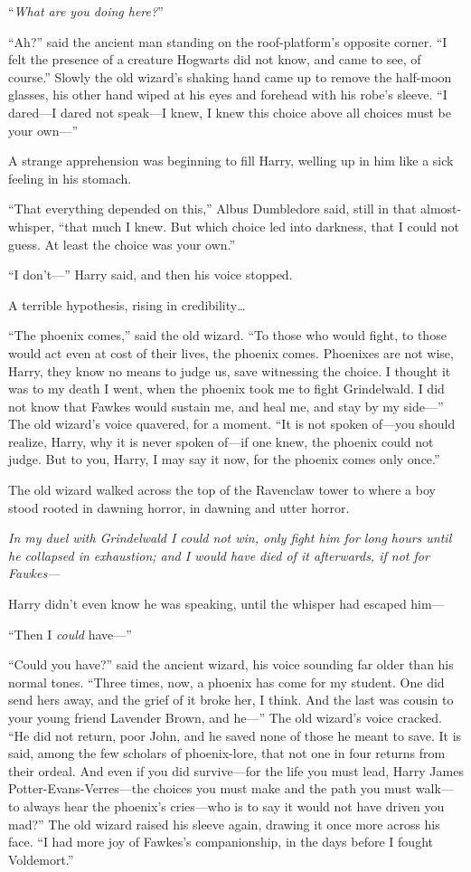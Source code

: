 “\emph{What are you doing here?}”

“Ah?” said the ancient man standing on the roof-platform’s opposite corner. “I felt the presence of a creature Hogwarts did not know, and came to see, of course.” Slowly the old wizard’s shaking hand came up to remove the half-moon glasses, his other hand wiped at his eyes and forehead with his robe’s sleeve. “I dared—I dared not speak—I knew, I knew this choice above all choices must be your own—”

A strange apprehension was beginning to fill Harry, welling up in him like a sick feeling in his stomach.

“That everything depended on this,” Albus Dumbledore said, still in that almost-whisper, “that much I knew. But which choice led into darkness, that I could not guess. At least the choice was your own.”

“I don’t—” Harry said, and then his voice stopped.

A terrible hypothesis, rising in credibility…

“The phoenix comes,” said the old wizard. “To those who would fight, to those would act even at cost of their lives, the phoenix comes. Phoenixes are not wise, Harry, they know no means to judge us, save witnessing the choice. I thought it was to my death I went, when the phoenix took me to fight Grindelwald. I did not know that Fawkes would sustain me, and heal me, and stay by my side—” The old wizard’s voice quavered, for a moment. “It is not spoken of—you should realize, Harry, why it is never spoken of—if one knew, the phoenix could not judge. But to you, Harry, I may say it now, for the phoenix comes only once.”

The old wizard walked across the top of the Ravenclaw tower to where a boy stood rooted in dawning horror, in dawning and utter horror.

\emph{In my duel with Grindelwald I could not win, only fight him for long hours until he collapsed in exhaustion; and I would have died of it afterwards, if not for Fawkes—}

Harry didn’t even know he was speaking, until the whisper had escaped him—

“Then I \emph{could} have—”

“Could you have?” said the ancient wizard, his voice sounding far older than his normal tones. “Three times, now, a phoenix has come for my student. One did send hers away, and the grief of it broke her, I think. And the last was cousin to your young friend Lavender Brown, and he—” The old wizard’s voice cracked. “He did not return, poor John, and he saved none of those he meant to save. It is said, among the few scholars of phoenix-lore, that not one in four returns from their ordeal. And even if you did survive—for the life you must lead, Harry James Potter-Evans-Verres—the choices you must make and the path you must walk—to always hear the phoenix’s cries—who is to say it would not have driven you mad?” The old wizard raised his sleeve again, drawing it once more across his face. “I had more joy of Fawkes’s companionship, in the days before I fought Voldemort.”

